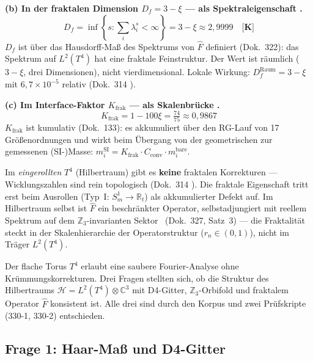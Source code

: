 \textbf{(b) In der fraktalen Dimension $D_f = 3-\xi$ — als Spektraleigenschaft \K.}
\begin{equation}
  D_f = \inf\!\left\{s:\sum_i\lambda_i^s < \infty\right\}
  = 3 - \xi \approx 2{,}9999
  \quad\textbf{[K]}
\end{equation}
$D_f$ ist über das Hausdorff-Maß des Spektrums von $\hat{F}$
definiert (Dok.~322): das Spektrum auf $L^2(T^4)$ hat eine fraktale
Feinstruktur. Der Wert ist räumlich ($3-\xi$, drei Dimensionen),
nicht vierdimensional.
Lokale Wirkung: $D_f^\text{Raum} = 3-\xi$ mit $6{,}7\times10^{-5}$
relativ (Dok.~314 \K).

\textbf{(c) Im Interface-Faktor $K_\text{frak}$ — als Skalenbrücke \K.}
\begin{equation}
  K_\text{frak} = 1 - 100\xi = \tfrac{74}{75} \approx 0{,}9867
\end{equation}
$K_\text{frak}$ ist kumulativ (Dok.~133): es akkumuliert über den
RG-Lauf von 17 Größenordnungen und wirkt beim Übergang von der
geometrischen zur gemessenen (SI-)Masse:
$m_i^\text{SI} = K_\text{frak}\cdot C_\text{conv}\cdot m_i^\text{bare}$.

\begin{tcolorbox}[ffgftbox,title={Entscheidende Trennung \K}]
  Im \emph{eingerollten} $T^4$ (Hilbertraum) gibt es
  \textbf{keine} fraktalen Korrekturen —
  Wicklungszahlen sind rein topologisch (Dok.~314 \K).
  Die fraktale Eigenschaft tritt erst beim Ausrollen
  (Typ~I: $S^1_m \to \mathbb{R}_t$) als akkumulierter Defekt auf.
  Im Hilbertraum selbst ist $\hat{F}$ ein beschränkter Operator,
  selbstadjungiert mit reellem Spektrum auf dem
  $\mathbb{Z}_3$-invarianten Sektor \B\ (Dok.~327, Satz~3) —
  die Fraktalität steckt in der Skalenhierarchie der Operatorstruktur
  ($r_n \in (0,1)$), nicht im Träger $L^2(T^4)$.
\end{tcolorbox}


\label{sec:hilbert}

Der flache Torus $T^4$ erlaubt eine saubere Fourier-Analyse
ohne Krümmungskorrekturen. Drei Fragen stellten sich,
ob die Struktur des Hilbertraums $\mathcal{H} = L^2(T^4)\otimes\mathbb{C}^3$
mit D4-Gitter, $\mathbb{Z}_3$-Orbifold und fraktalem Operator $\hat{F}$
konsistent ist. Alle drei sind durch den Korpus und zwei
Prüfskripte (330-1, 330-2) entschieden.

\subsection{Frage 1: Haar-Maß und D4-Gitter \B}


